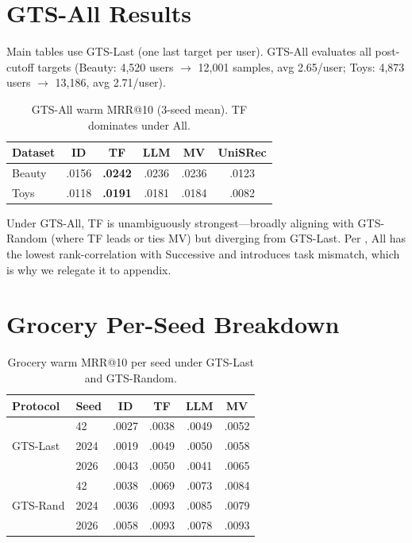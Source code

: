 \documentclass[sigconf,natbib=true,anonymous]{acmart}
\begin{document}
\appendix

\section{GTS-All Results}
\label{app:gts-all}

Main tables use GTS-Last (one last target per user).
GTS-All evaluates all post-cutoff targets (Beauty: 4{,}520 users $\to$ 12{,}001 samples, avg 2.65/user; Toys: 4{,}873 users $\to$ 13{,}186, avg 2.71/user).

\begin{table}[h]
\centering
\caption{GTS-All warm MRR@10 (3-seed mean).  TF dominates under All.}
\label{tab:gts-all}
\small
\begin{tabular}{@{}lccccc@{}}
\toprule
Dataset & ID & TF & LLM & MV & UniSRec \\
\midrule
Beauty & .0156 & \textbf{.0242} & .0236 & .0236 & .0123 \\
Toys   & .0118 & \textbf{.0191} & .0181 & .0184 & .0082 \\
\bottomrule
\end{tabular}
\end{table}

Under GTS-All, TF is unambiguously strongest---broadly aligning with GTS-Random (where TF leads or ties MV) but diverging from GTS-Last.
Per \citet{liang2024timetosplit}, All has the lowest rank-correlation with Successive and introduces task mismatch, which is why we relegate it to appendix.

\section{Grocery Per-Seed Breakdown}
\label{app:grocery}

\begin{table}[h]
\centering
\caption{Grocery warm MRR@10 per seed under GTS-Last and GTS-Random.}
\label{tab:grocery-perseed}
\small
\setlength{\tabcolsep}{3pt}
\begin{tabular}{@{}llcccc@{}}
\toprule
Protocol & Seed & ID & TF & LLM & MV \\
\midrule
\multirow{3}{*}{GTS-Last}
 & 42    & .0027 & .0038 & .0049 & .0052 \\
 & 2024  & .0019 & .0049 & .0050 & .0058 \\
 & 2026  & .0043 & .0050 & .0041 & .0065 \\
\midrule
\multirow{3}{*}{GTS-Rand}
 & 42    & .0038 & .0069 & .0073 & .0084 \\
 & 2024  & .0036 & .0093 & .0085 & .0079 \\
 & 2026  & .0058 & .0093 & .0078 & .0093 \\
\bottomrule
\end{tabular}
\end{table}
\end{document}
